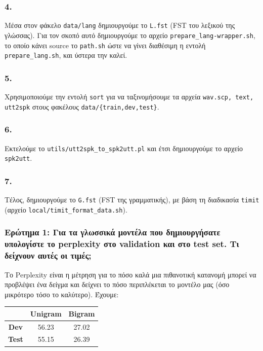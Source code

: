 \documentclass[a4paper, 12pt]{article}
\begin{document}
        \subsubsection*{4.}
            Μέσα στον φάκελο \verb|data/lang| δημιουργούμε το \verb|L.fst| (FST του λεξικού της γλώσσας). Για τον σκοπό αυτό δημιουργούμε το αρχείο \verb|prepare_lang-wrapper.sh|, το οποίο κάνει source το \verb|path.sh| ώστε να γίνει διαθέσιμη η εντολή \verb|prepare_lang.sh|, και ύστερα την καλεί.
        
        \subsubsection*{5.}
            Χρησιμοποιούμε την εντολή \verb|sort| για να ταξινομήσουμε τα αρχεία \verb|wav.scp, text, utt2spk| στους φακέλους \verb|data/{train,dev,test}|.
            
        \subsubsection*{6.}
            Εκτελούμε το \verb|utils/utt2spk_to_spk2utt.pl| και έτσι δημιουργούμε το αρχείο \verb|spk2utt|.
            
        \subsubsection*{7.}
            Τέλος, δημιουργούμε το \verb|G.fst| (FST της γραμματικής), με βάση τη διαδικασία \verb|timit| (αρχείο \verb|local/timit_format_data.sh|).

        \subsubsection*{Ερώτημα 1: Για τα γλωσσικά μοντέλα που δημιουργήσατε υπολογίστε το perplexity στο validation και στο test set. Τι δείχνουν αυτές οι τιμές;} 
        
        Το Perplexity είναι η μέτρηση για το πόσο καλά μια πιθανοτική κατανομή μπορεί να προβλέψει ένα δείγμα και δείχνει το πόσο περιπλέκεται το μοντέλο μας (όσο μικρότερο τόσο το καλύτερο). Έχουμε: \\
        
        \begin{center}
            \begin{tabular}{|c|c|c|}
                \hline
                              & \textbf{Unigram} & \textbf{Bigram} \\ \hline
                \textbf{Dev}  & 56.23            & 27.02  \\ \hline
                \textbf{Test} & 55.15            & 26.39  \\ \hline
            \end{tabular}    
        \end{center}
        
\end{document}
